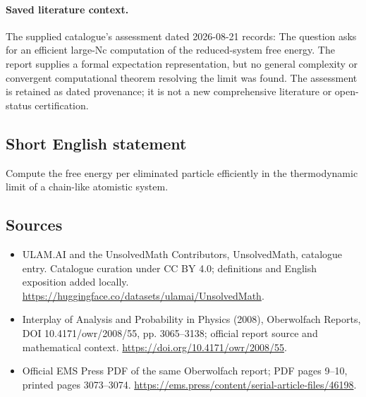 \documentclass[11pt]{article}
\begin{document}
\paragraph{Saved literature context.} The supplied catalogue's assessment dated 2026-08-21 records: The question asks for an efficient large-Nc computation of the reduced-system free energy. The report supplies a formal expectation representation, but no general complexity or convergent computational theorem resolving the limit was found. The assessment is retained as dated provenance; it is not a new comprehensive literature or open-status certification.
\subsection{Short English statement}
Compute the free energy per eliminated particle efficiently in the thermodynamic limit of a chain-like atomistic system.
\subsection{Sources}
\begin{itemize}
\item[\hypertarget{source:statement:1}{S1}] ULAM.AI and the UnsolvedMath Contributors, UnsolvedMath, catalogue entry. Catalogue curation under CC BY 4.0; definitions and English exposition added locally.
\url{https://huggingface.co/datasets/ulamai/UnsolvedMath}.
\item[\hypertarget{source:statement:2}{S2}] Interplay of Analysis and Probability in Physics (2008), Oberwolfach Reports, DOI 10.4171/owr/2008/55, pp. 3065--3138; official report source and mathematical context.
\url{https://doi.org/10.4171/owr/2008/55}.
\item[\hypertarget{source:statement:3}{S3}] Official EMS Press PDF of the same Oberwolfach report; PDF pages 9--10, printed pages 3073--3074.
\url{https://ems.press/content/serial-article-files/46198}.
\end{itemize}
\label{end:statement}
\end{document}

